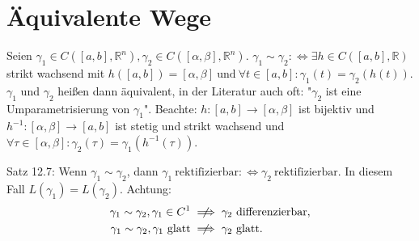 \documentclass[a4paper]{article}
\theoremstyle{definition}
\theoremstyle{remark}
\newcommand{\defiff}{:\Longleftrightarrow}
\begin{document}
	\section*{Äquivalente Wege}
		Seien $\gamma_1\in C([a, b], \mathbb{R}^n), \gamma_2\in C([\alpha, \beta], \mathbb{R}^n)$.
		$\gamma_1\sim\gamma_2 \defiff\exists h\in C([a, b], \mathbb{R})$ strikt wachsend mit
		$h([a, b])=[\alpha, \beta]~\text{und}~\forall t\in[a,b]:\gamma_1(t)=\gamma_2(h(t))$.
		$\gamma_1$ und $\gamma_2$ heißen dann äquivalent, in der Literatur auch oft:
		"$\gamma_2$ ist eine Umparametrisierung von $\gamma_1$". Beachte:
		$h\colon[a, b]\to[\alpha, \beta]$ ist bijektiv und $h^{-1}\colon[\alpha, \beta]
		\to[a,b]$ ist stetig und strikt wachsend und $\forall\tau\in[\alpha, \beta]:
		\gamma_2(\tau)=\gamma_1(h^{-1}(\tau))$.

		Satz 12.7: Wenn $\gamma_1\sim\gamma_2$, dann $\gamma_1~\text{rektifizierbar}\defiff
		\gamma_2~\text{rektifizierbar}$. In diesem Fall $L(\gamma_1)=L(\gamma_2)$. Achtung:
		\begin{align*}
			\gamma_1\sim\gamma_2, \gamma_1\in C^1 &\centernot\implies \gamma_2~\text{differenzierbar},\\
			\gamma_1\sim\gamma_2, \gamma_1~\text{glatt} &\centernot\implies \gamma_2~\text{glatt}.
		\end{align*}
\end{document}
